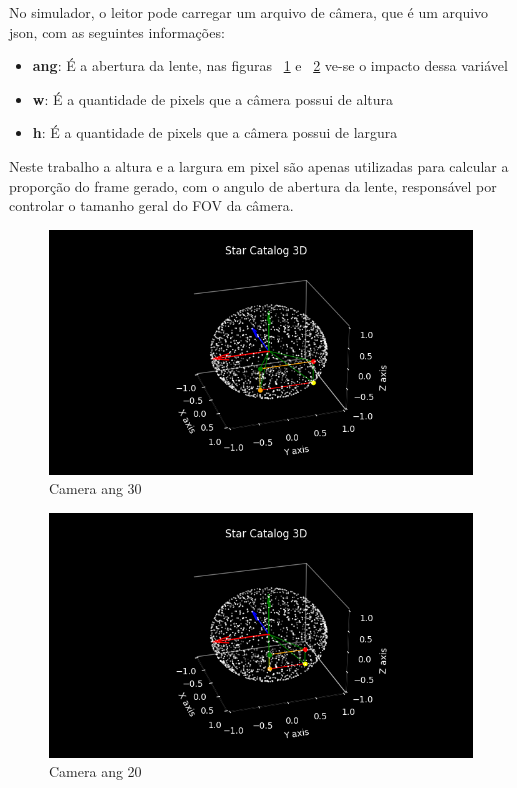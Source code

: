 No simulador, o leitor pode carregar um arquivo de câmera, que é um arquivo json, com as seguintes informações:

\begin{itemize}
    \item \textbf{ang}: É a abertura da lente, nas figuras ~\ref{fig:Camera_ang_30} e ~\ref{fig:Camera_ang_20} ve-se o impacto dessa variável\tabularnewline
    \item \textbf{w}: É a quantidade de pixels que a câmera possui de altura\tabularnewline
    \item \textbf{h}: É a quantidade de pixels que a câmera possui de largura\tabularnewline
\end{itemize}

Neste trabalho a altura e a largura em pixel são apenas utilizadas para calcular a proporção do frame gerado, com o angulo de abertura da lente, responsável por controlar o tamanho geral do FOV da câmera.

\begin{figure}[H]
    \centering
    \includegraphics[width=1\columnwidth]{images/Camera_ang_30.png}
    \caption{Camera ang 30}
    \label{fig:Camera_ang_30}
\end{figure}

\begin{figure}[H]
    \centering
    \includegraphics[width=1\columnwidth]{images/Camera_ang_20.png}
    \caption{Camera ang 20}
    \label{fig:Camera_ang_20}
\end{figure}

